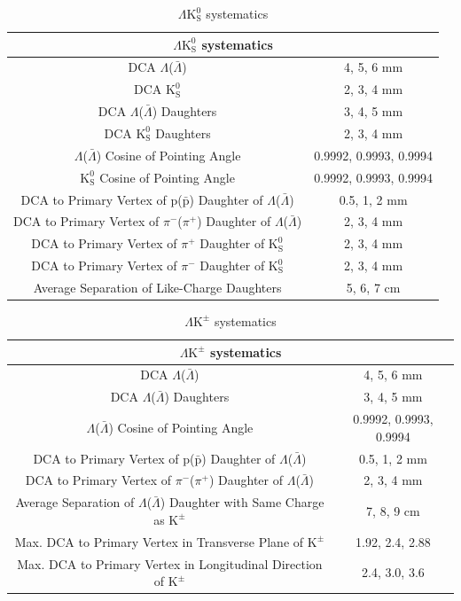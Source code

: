 \documentclass[ALICE,manyauthors]{cernphprep}
\newcommand{\LamALam}{$\Lambda$($\bar{\Lambda}$)\xspace}
\newcommand{\Kpm}{$\mathrm{K^{\pm}}$\xspace}
\newcommand{\Ks}{$\mathrm{K^{0}_{S}}$\xspace}
\newcommand{\LamKpm}{$\Lambda\mathrm{K^{\pm}}$\xspace}
\newcommand{\LamKs}{$\Lambda\mathrm{K^{0}_{S}}$\xspace}
\begin{document}
\begin{table}[htbp]
 \centering 
  \renewcommand{\arraystretch}{1.2}
  \begin{tabular}{c|c}
   \multicolumn{2}{c}{\LamKs systematics} \\
   \hline  
   DCA \LamALam & 4, 5, 6 mm \\
   \hline
   DCA \Ks & 2, 3, 4 mm \\
   \hline
   DCA \LamALam Daughters & 3, 4, 5 mm \\
   \hline
   DCA \Ks Daughters & 2, 3, 4 mm \\
   \hline
   \LamALam Cosine of Pointing Angle & 0.9992, 0.9993, 0.9994 \\
   \hline
   \Ks Cosine of Pointing Angle & 0.9992, 0.9993, 0.9994 \\
   \hline
   DCA to Primary Vertex of p($\bar{\mathrm{p}}$) Daughter of \LamALam & 0.5, 1, 2 mm \\
   \hline
   DCA to Primary Vertex of $\pi^{-}$($\pi^{+}$) Daughter of \LamALam &  2, 3, 4 mm \\ 
   \hline
   DCA to Primary Vertex of $\pi^{+}$ Daughter of \Ks & 2, 3, 4 mm \\
   \hline
   DCA to Primary Vertex of $\pi^{-}$ Daughter of \Ks & 2, 3, 4 mm \\
   \hline
   Average Separation of Like-Charge Daughters & 5, 6, 7 cm \\
   \hline
  \end{tabular}
 \caption{\LamKs systematics}
 \label{tab:LamK0sSystematics} 
\end{table}


\begin{table}[htbp]
 \centering 
  \renewcommand{\arraystretch}{1.2}
  \begin{tabular}{c|c}
   \multicolumn{2}{c}{\LamKpm systematics} \\
   \hline  
   DCA \LamALam & 4, 5, 6 mm \\
   \hline
   DCA \LamALam Daughters & 3, 4, 5 mm \\
   \hline
   \LamALam Cosine of Pointing Angle & 0.9992, 0.9993, 0.9994 \\
   \hline
   DCA to Primary Vertex of p($\bar{\mathrm{p}}$) Daughter of \LamALam &  0.5, 1, 2 mm \\
   \hline
   DCA to Primary Vertex of $\pi^{-}$($\pi^{+}$) Daughter of \LamALam &  2, 3, 4 mm  \\
   \hline
   Average Separation of \LamALam Daughter with Same Charge as \Kpm & 7, 8, 9 cm \\
   \hline
   Max. DCA to Primary Vertex in Transverse Plane of \Kpm & 1.92, 2.4, 2.88 \\
   \hline
   Max. DCA to Primary Vertex in Longitudinal Direction of \Kpm & 2.4, 3.0, 3.6 \\
   \hline
  \end{tabular}
 \caption{\LamKpm systematics}
 \label{tab:LamKchSystematics} 
\end{table}
\end{document}
